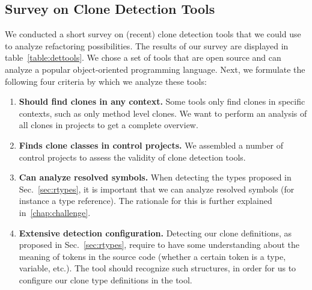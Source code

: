 \documentclass[a4paper]{article}
\begin{document}
\subsection{Survey on Clone Detection Tools}
\label{ch:tool-overview}
We conducted a short survey on (recent) clone detection tools that we could use to analyze refactoring possibilities. The results of our survey are displayed in table~\ref{table:dettools}. We chose a set of tools that are open source and can analyze a popular object-oriented programming language. Next, we formulate the following four criteria by which we analyze these tools:
\begin{enumerate}
    \item \textbf{Should find clones in any context.} Some tools only find clones in specific contexts, such as only method level clones. We want to perform an analysis of all clones in projects to get a complete overview.
\item \textbf{Finds clone classes in control projects.} We assembled a number of control projects to assess the validity of clone detection tools.
\item \textbf{Can analyze resolved symbols.} When detecting the types proposed in Sec.~\ref{sec:rtypes}, it is important that we can analyze resolved symbols (for instance a type reference). The rationale for this is further explained in~\ref{chap:challenge}.
\item \textbf{Extensive detection configuration.} Detecting our clone definitions, as proposed in Sec.~\ref{sec:rtypes}, require to have some understanding about the meaning of tokens in the source code (whether a certain token is a type, variable, etc.). The tool should recognize such structures, in order for us to configure our clone type definitions in the tool.
\end{enumerate}
\end{document}
